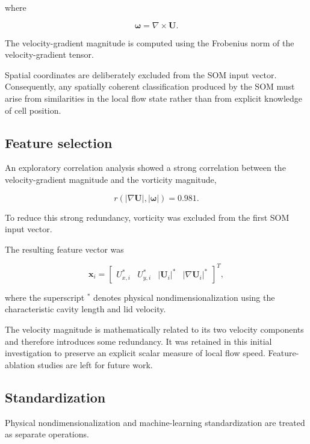 where

\begin{equation}
\boldsymbol{\omega}=\nabla\times\mathbf{U}.
\end{equation}

The velocity-gradient magnitude is computed using the Frobenius norm of the
velocity-gradient tensor.

Spatial coordinates are deliberately excluded from the SOM input vector.
Consequently, any spatially coherent classification produced by the SOM must
arise from similarities in the local flow state rather than from explicit
knowledge of cell position.

\subsection{Feature selection}

An exploratory correlation analysis showed a strong correlation between the
velocity-gradient magnitude and the vorticity magnitude,

\begin{equation}
r\left(|\nabla\mathbf{U}|,|\boldsymbol{\omega}|\right)
=
0.981.
\end{equation}

To reduce this strong redundancy, vorticity was excluded from the first SOM
input vector.

The resulting feature vector was

\begin{equation}
\mathbf{x}_i =
\begin{bmatrix}
U_{x,i}^{*} &
U_{y,i}^{*} &
|\mathbf{U}_i|^{*} &
|\nabla\mathbf{U}_i|^{*}
\end{bmatrix}^{T},
\end{equation}

where the superscript \(^{*}\) denotes physical nondimensionalization using
the characteristic cavity length and lid velocity.

The velocity magnitude is mathematically related to its two velocity
components and therefore introduces some redundancy. It was retained in this
initial investigation to preserve an explicit scalar measure of local flow
speed. Feature-ablation studies are left for future work.

\subsection{Standardization}

Physical nondimensionalization and machine-learning standardization are
treated as separate operations.

